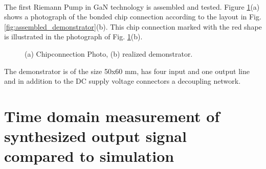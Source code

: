 \documentclass[journal]{IEEEtran}
\begin{document}
\\
The first Riemann Pump in GaN technology is assembled and tested.
Figure \ref{fig:photo_chipconnection_demonstrator}(a) shows a photograph of the bonded chip connection according to the layout in Fig. \ref{fig:assembled_demonstrator}(b).
This chip connection marked with the red shape is illustrated in the photograph of Fig. \ref{fig:photo_chipconnection_demonstrator}(b).
\begin{figure}[htb]
  \centering
	\begin{scriptsize}
  	\def\svgwidth{\columnwidth}
 	 
  	\caption{(a) Chipconnection Photo, (b) realized demonstrator.}
  	\label{fig:photo_chipconnection_demonstrator}
	\end{scriptsize}
\end{figure}
The demonstrator is of the size 50x60 mm, has four input and one output line and in addition to the DC supply voltage connectors a decoupling network.
%
\section{Time domain measurement of synthesized output signal compared to simulation}
\label{sec:experiment}
\end{document}
